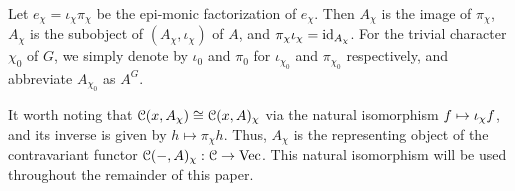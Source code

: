 \documentclass{amsart}
\begin{document}
Let $e_{\chi} = \iota_{\chi} \pi_{\chi}$ be the epi-monic factorization of $e_{\chi}$. Then $A_\chi$ is the image of $\pi_\chi$, $A_\chi$ is the subobject of $(A_\chi, \iota_\chi)$ of $A$, and $\pi_\chi \iota_\chi =\operatorname{id}_{A_{\chi}}$. For the trivial character $\chi_0$ of $G$, we simply denote by $\iota_0$ and $\pi_0$ for $\iota_{\chi_0}$ and  $\pi_{\chi_0}$ respectively, and abbreviate $A_{\chi_0}$ as $A^G$. 
\begin{rmk} \label{r:repr}
It worth noting that ${\EuScript{C}}(x, A_\chi) \cong {\EuScript{C}}(x, A)_\chi$ via the natural isomorphism $f \mapsto {\iota}_\chi f$, and its inverse is given by $h \mapsto \pi_\chi h $. Thus, $A_\chi$ is the representing object of the contravariant functor ${\EuScript{C}}(-, A)_\chi : {\EuScript{C}} \to \operatorname{Vec}$. This natural isomorphism will be used throughout the remainder of this paper. 
\end{rmk}

\end{document}
